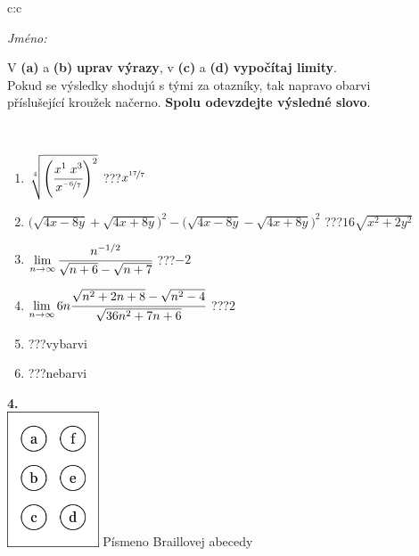 \documentclass[10pt]{report}
\begin{document}
\begin{tabular}{c:c}
\begin{minipage}[c][104.5mm][t]{0.5\linewidth}
\begin{center}
\textit{Jméno:}\phantom{xxxxxxxxxxxxxxxxxxxxxxxxxxxxxxxxxxxxxxxxxxxxxxxxxxxxxxxxxxxxxxxxx}\\[5mm]
\begin{minipage}{0.95\linewidth}
\begin{center}
V \textbf{(a)} a \textbf{(b)} \textbf{uprav výrazy}, v \textbf{(c)} a \textbf{(d)} \textbf{vypočítaj limity}.\\Pokud se výsledky shodujú s tými za otazníky, tak napravo obarvi\\příslušející kroužek načerno. \textbf{Spolu odevzdejte výsledné slovo}.
\end{center}
\end{minipage}
\\[1mm]
\begin{minipage}{0.79\linewidth}
\begin{center}
\begin{varwidth}{\linewidth}
\begin{enumerate}
\small
\item $\sqrt[4]{\left(\cfrac{x^{1}\;x^{3}}{x^{\nicefrac{-6}{7}}}\right)^{2}}$\quad \dotfill\; ???\;\dotfill \quad $x^{\nicefrac{17}{7}}$
\item {\footnotesize{\scriptsize$\big(\sqrt{4x-8y}+\sqrt{4x+8y}\big)^2-\big(\sqrt{4x-8y}-\sqrt{4x+8y}\big)^2$}\quad \dotfill\; ???\;\dotfill \quad $16\sqrt{x^2+2y^2}$}
\item $\lim\limits_{n\to\infty}\cfrac{n^{-1/2}}{\sqrt{n+6}-\sqrt{n+7}}$\quad \dotfill\; ???\;\dotfill \quad $-2$
\item $\lim\limits_{n\to\infty}6n\cfrac{\sqrt{n^2+2n+8}-\sqrt{n^2-4}}{\sqrt{36n^2+7n+6}}$\quad \dotfill\; ???\;\dotfill \quad $2$
\item \quad \dotfill\; ???\;\dotfill \quad vybarvi
\item \quad \dotfill\; ???\;\dotfill \quad nebarvi
\end{enumerate}
\end{varwidth}
\end{center}
\end{minipage}
\begin{minipage}{0.20\linewidth}
\begin{center}
{\Huge\bfseries 4.} \\[2mm]
\includegraphics[height=40mm]{../images/braille.png}
{\small Písmeno Braillovej abecedy}
\end{center}
\end{minipage}
\end{center}
\end{minipage}
%
\end{tabular}
\end{document}
